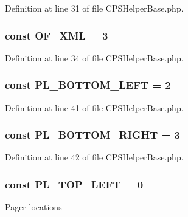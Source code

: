 Definition at line 31 of file CPSHelperBase.php.

\hypertarget{classCPSHelperBase_a3a27aba2d308cba737ac8177f210b547}{
\subsubsection[{OF\_\-XML}]{\setlength{\rightskip}{0pt plus 5cm}const {\bf OF\_\-XML} = 3}}
\label{classCPSHelperBase_a3a27aba2d308cba737ac8177f210b547}


Definition at line 34 of file CPSHelperBase.php.

\hypertarget{classCPSHelperBase_a01a4f4dcd309a862d2489734b17b6d29}{
\subsubsection[{PL\_\-BOTTOM\_\-LEFT}]{\setlength{\rightskip}{0pt plus 5cm}const {\bf PL\_\-BOTTOM\_\-LEFT} = 2}}
\label{classCPSHelperBase_a01a4f4dcd309a862d2489734b17b6d29}


Definition at line 41 of file CPSHelperBase.php.

\hypertarget{classCPSHelperBase_ac1425b823028e19f350a752e8bb08000}{
\subsubsection[{PL\_\-BOTTOM\_\-RIGHT}]{\setlength{\rightskip}{0pt plus 5cm}const {\bf PL\_\-BOTTOM\_\-RIGHT} = 3}}
\label{classCPSHelperBase_ac1425b823028e19f350a752e8bb08000}


Definition at line 42 of file CPSHelperBase.php.

\hypertarget{classCPSHelperBase_ac77237b0fcb9d6540fca4eb80f4487f8}{
\subsubsection[{PL\_\-TOP\_\-LEFT}]{\setlength{\rightskip}{0pt plus 5cm}const {\bf PL\_\-TOP\_\-LEFT} = 0}}
\label{classCPSHelperBase_ac77237b0fcb9d6540fca4eb80f4487f8}
Pager locations 

